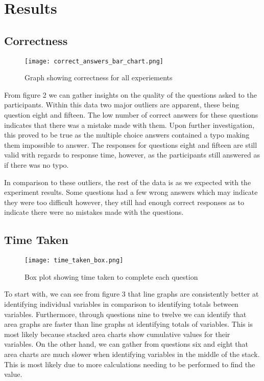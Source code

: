 \section{Results}
\subsection*{Correctness}
\begin{figure}[H]
    \centering
    \texttt{[image: correct\_answers\_bar\_chart.png]}
    \caption{Graph showing correctness for all experiements}
\end{figure}
\begin{flushleft}
    \quad From figure 2 we can gather insights on the quality of the questions asked to the participants.
    Within this data two major outliers are apparent, these being question eight and fifteen. The low number of 
    correct answers for these questions indicates that there was a mistake made with them. Upon further investigation,
    this proved to be true as the multiple choice answers contained a typo making them impossible to answer. The responses for questions eight and fifteen 
    are still valid with regards to response time, however, as the participants still answered as if there was no typo.

    \quad In comparison to these outliers, the rest of the data is as we expected with the experiment results. Some questions had a few wrong answers which may indicate they were too difficult
    however, they still had enough correct responses as to indicate there were no mistakes made with the questions.
\end{flushleft}

\subsection*{Time Taken}
\begin{figure}[H]
    \centering
    \texttt{[image: time\_taken\_box.png]}
    \caption{Box plot showing time taken to complete each question}
\end{figure}
\begin{flushleft}
    \quad To start with, we can see from figure 3 that line graphs are consistently better at identifying individual variables in comparison to identifying totals between variables.
    Furthermore, through questions nine to twelve we can identify that area graphs are faster than line graphs at identifying totals of variables. This is most likely because stacked 
    area charts show cumulative values for their variables. On the other hand, we can gather from questions six and eight that area charts are much slower when identifying variables in the middle of
    the stack. This is most likely due to more calculations needing to be performed to find the value.
\end{flushleft}

